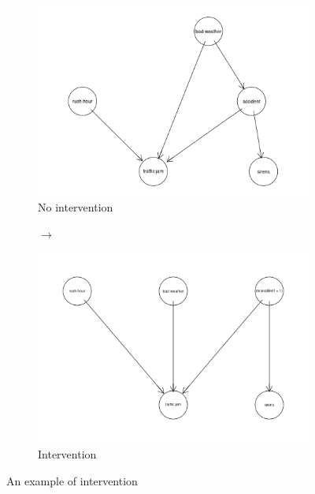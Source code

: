 \documentclass{article}
\begin{document}
\begin{figure}

  \centering
  \begin{subfigure}{0.45\textwidth}
    \centering
    \includegraphics[width=\linewidth]{images/trafficjam.png} 
    \caption{No intervention}
  \end{subfigure}
  \begin{subfigure}{0.05\textwidth}
    \centering
    $\rightarrow$
  \end{subfigure}
  \begin{subfigure}{0.45\textwidth}
    \includegraphics[width=\linewidth]{images/trafficjam_intervention.png}
    \caption{Intervention}
  \end{subfigure}

  \caption{An example of intervention}
  \label{dag3}
\end{figure}
\end{document}
